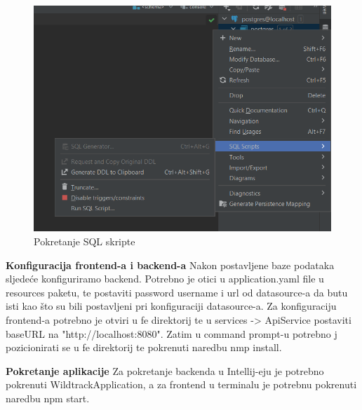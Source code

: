 			\begin{figure}[H]
				\includegraphics[scale=0.3]{slike/runSqlScript.png} 
				\centering
				\caption{Pokretanje SQL skripte}
				\label{fig:promjene}
			\end{figure}
			
			\textbf{Konfiguracija frontend-a i backend-a}
			Nakon postavljene baze podataka sljedeće konfiguriramo backend. Potrebno je otici u application.yaml file u resources paketu, te postaviti password username i url od datasource-a da butu isti kao što su bili postavljeni pri konfiguraciji datasource-a. Za konfiguraciju frontend-a potrebno je otviri u fe direktorij te u services -> ApiService postaviti baseURL na "http://localhost:8080". Zatim u command prompt-u potrebno j pozicionirati se u fe direktorij te pokrenuti naredbu nmp install.
			
			\textbf{Pokretanje aplikacije}
			Za pokretanje backenda u Intellij-eju je potrebno pokrenuti WildtrackApplication, a za frontend u terminalu je potrebnu pokrenuti naredbu npm start.
			
			\eject 